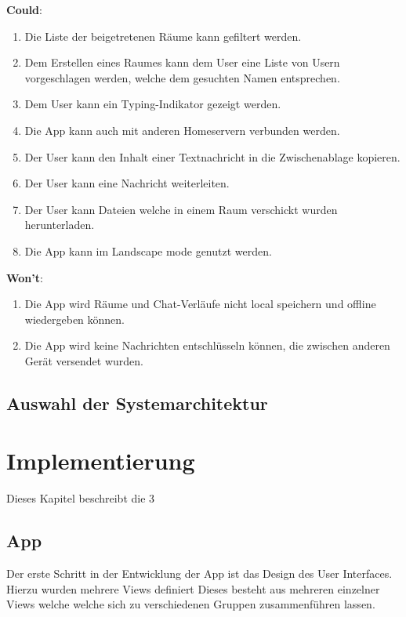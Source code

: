     \textbf{Could}:
    \begin{enumerate}[label={\roman*.}, leftmargin=2.5cm]
        \item Die Liste der beigetretenen Räume kann gefiltert werden.
        \item Dem Erstellen eines Raumes kann dem User eine Liste von Usern vorgeschlagen werden, welche dem gesuchten Namen entsprechen.
        \item Dem User kann ein Typing-Indikator gezeigt werden.
        \item Die App kann auch mit anderen Homeservern verbunden werden.
        \item Der User kann den Inhalt einer Textnachricht in die Zwischenablage kopieren.
        \item Der User kann eine Nachricht weiterleiten.
        \item Der User kann Dateien welche in einem Raum verschickt wurden herunterladen.
        \item Die App kann im Landscape mode genutzt werden.
    \end{enumerate}

    \textbf{Won't}:
    \begin{enumerate}[label={\roman*.}, leftmargin=2.5cm]
        \item Die App wird Räume und Chat-Verläufe nicht local speichern und offline wiedergeben können.
        \item Die App wird keine Nachrichten entschlüsseln können, die zwischen anderen Gerät versendet wurden.
    \end{enumerate}


    \section{Auswahl der Systemarchitektur}\label{sec:auswahl-der-systemarchitektur}

    \newpage
    \chapter{Implementierung}\label{ch:implementierung}
    Dieses Kapitel beschreibt die 3



    \section{App}
    Der erste Schritt in der Entwicklung der App ist das Design des User Interfaces.
    Hierzu wurden mehrere Views definiert
    Dieses besteht aus mehreren einzelner Views welche welche sich zu verschiedenen Gruppen zusammenführen lassen.

